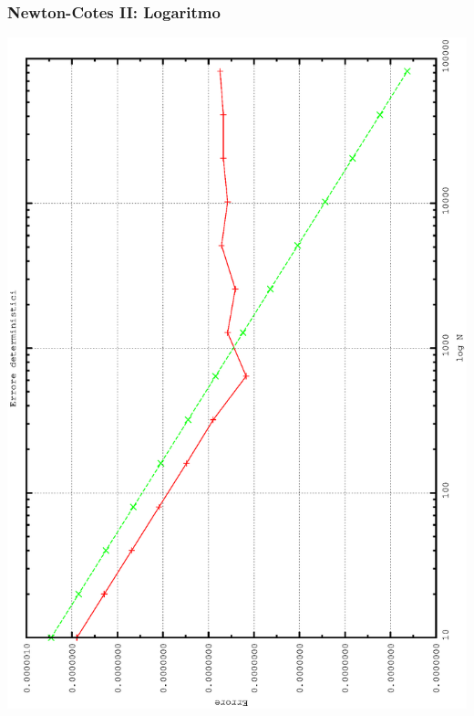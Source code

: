 \subsubsection*{Newton-Cotes II: Logaritmo}
\begin{center}
\includegraphics[width=0.7\columnwidth,angle=-90]{plot_simp_log.eps}
\end{center}

